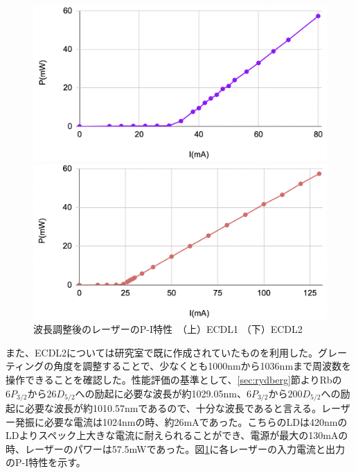 \documentclass[dvipdfmx]{jsreport}
\begin{document}
\begin{figure}[hbtp]
\centering
\begin{minipage}[b]{0.45\linewidth}
\includegraphics[width=1\textwidth]{images/420-P-I.png}
\end{minipage}
\begin{minipage}[b]{0.45\linewidth}
\includegraphics[width=1\textwidth]{images/1024-P-I.png}
\end{minipage}
\caption{\label{fig:p-i}波長調整後のレーザーのP-I特性　（上）ECDL1 （下）ECDL2}
\end{figure}
また、ECDL2については研究室で既に作成されていたものを利用した。グレーティングの角度を調整することで、少なくとも1000nmから1036nmまで周波数を操作できることを確認した。性能評価の基準として、\ref{sec:rydberg}節よりRbの$6P_{3/2}$から$26D_{5/2}$への励起に必要な波長が約1029.05nm、$6P_{3/2}$から$200D_{5/2}$への励起に必要な波長が約1010.57nmであるので、十分な波長であると言える。レーザー発振に必要な電流は1024nmの時、約26mAであった。こちらのLDは420nmのLDよりスペック上大きな電流に耐えられることができ、電源が最大の130mAの時、レーザーのパワーは57.5mWであった。図\ref{fig:p-i}に各レーザーの入力電流と出力のP-I特性を示す。
\end{document}
